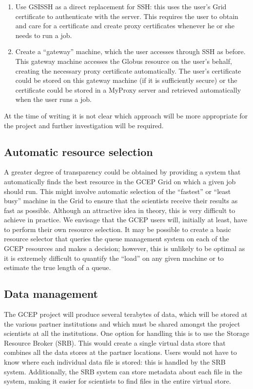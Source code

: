 \documentclass[a4paper]{article}
\begin{document}
\begin{multicols}{2}
\begin{enumerate}
\item Use GSISSH as a direct replacement for SSH: this uses the user's Grid certificate to authenticate with the server.  This requires the user to obtain and care for a certificate and create proxy certificates whenever he or she needs to run a job.
\item Create a ``gateway'' machine, which the user accesses through SSH as before. This gateway machine accesses the Globus resource on the user's behalf, creating the necessary proxy certificate automatically.  The user's certificate could be stored on this gateway machine (if it is sufficiently secure) or the certificate could be stored in a MyProxy server and retrieved automatically when the user runs a job.
\end{enumerate}

At the time of writing it is not clear which approach will be more appropriate for the project and further investigation will be required.

\subsection{Automatic resource selection}
A greater degree of transparency could be obtained by providing a system that automatically finds the best resource in the GCEP Grid on which a given job should run.  This might involve automatic selection of the ``fastest'' or ``least busy'' machine in the Grid to ensure that the scientists receive their results as fast as possible.  Although an attractive idea in theory, this is very difficult to achieve in practice.  We envisage that the GCEP users will, initially at least, have to perform their own resource selection.  It may be possible to create a basic resource selector that queries the queue management system on each of the GCEP resources and makes a decision; however, this is unlikely to be optimal as it is extremely difficult to quantify the ``load'' on any given machine or to estimate the true length of a queue.

\subsection{Data management}
The GCEP project will produce several terabytes of data, which will be stored at the various partner institutions and which must be shared amongst the project scientists at all the institutions.  One option for handling this is to use the Storage Resource Broker (SRB).  This would create a single virtual data store that combines all the data stores at the partner locations.  Users would not have to know where each individual data file is stored: this is handled by the SRB system.  Additionally, the SRB system can store metadata about each file in the system, making it easier for scientists to find files in the entire virtual store.


\end{multicols}
\end{document}
